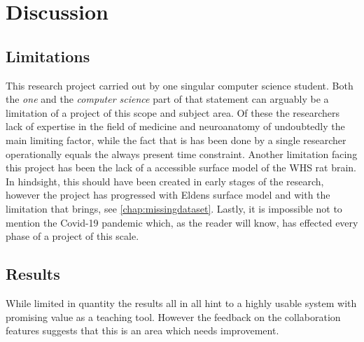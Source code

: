 \chapter{Discussion}

\section{Limitations}



This research project carried out by one singular computer science student. Both the \textit{one} and the \textit{computer science} part of that statement can arguably be a limitation of a project of this scope and subject area. Of these the researchers lack of expertise in the field of medicine and neuroanatomy of undoubtedly the main limiting factor, while the fact that is has been done by a single researcher operationally equals the always present time constraint. Another limitation facing this project has been the lack of a accessible surface model of the WHS rat brain. In hindsight, this should have been created in early stages of the research, however the project has progressed with Eldens surface model and with the limitation that brings, see \autoref{chap:missingdataset}. Lastly, it is impossible not to mention the Covid-19 pandemic which, as the reader will know, has effected every phase of a project of this scale.

\section{Results}

While limited in quantity the results all in all hint to a highly usable system with promising value as a teaching tool. However the feedback on the collaboration features suggests that this is an area which needs improvement.

